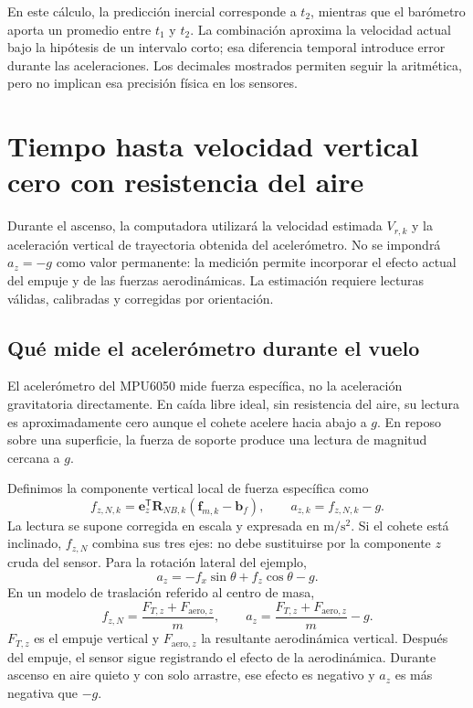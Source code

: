 \documentclass[11pt,a4paper]{article}
\begin{document}
En este cálculo, la predicción inercial corresponde a $t_2$, mientras que el barómetro aporta un promedio entre $t_1$ y $t_2$. La combinación aproxima la velocidad actual bajo la hipótesis de un intervalo corto; esa diferencia temporal introduce error durante las aceleraciones. Los decimales mostrados permiten seguir la aritmética, pero no implican esa precisión física en los sensores.
\newpage
\section{Tiempo hasta velocidad vertical cero con resistencia del aire}
Durante el ascenso, la computadora utilizará la velocidad estimada $V_{r,k}$ y la aceleración vertical de trayectoria obtenida del acelerómetro. No se impondrá $a_z=-g$ como valor permanente: la medición permite incorporar el efecto actual del empuje y de las fuerzas aerodinámicas. La estimación requiere lecturas válidas, calibradas y corregidas por orientación.

\subsection{Qué mide el acelerómetro durante el vuelo}
El acelerómetro del MPU6050 mide fuerza específica, no la aceleración gravitatoria directamente. En caída libre ideal, sin resistencia del aire, su lectura es aproximadamente cero aunque el cohete acelere hacia abajo a $g$. En reposo sobre una superficie, la fuerza de soporte produce una lectura de magnitud cercana a $g$.

Definimos la componente vertical local de fuerza específica como
\begin{equation}
 f_{z,N,k}=\mathbf e_z^{\mathsf T}\mathbf R_{NB,k}
 (\mathbf f_{m,k}-\mathbf b_f),
 \qquad \boxed{a_{z,k}=f_{z,N,k}-g}.
\end{equation}
La lectura se supone corregida en escala y expresada en $\mathrm{m/s^2}$. Si el cohete está inclinado, $f_{z,N}$ combina sus tres ejes: no debe sustituirse por la componente $z$ cruda del sensor. Para la rotación lateral del ejemplo,
\begin{equation}
 a_z=-f_x\sin\theta+f_z\cos\theta-g.
\end{equation}
En un modelo de traslación referido al centro de masa,
\begin{equation}
 f_{z,N}=\frac{F_{T,z}+F_{\mathrm{aero},z}}{m},\qquad
 a_z=\frac{F_{T,z}+F_{\mathrm{aero},z}}{m}-g.
\end{equation}
$F_{T,z}$ es el empuje vertical y $F_{\mathrm{aero},z}$ la resultante aerodinámica vertical. Después del empuje, el sensor sigue registrando el efecto de la aerodinámica. Durante ascenso en aire quieto y con solo arrastre, ese efecto es negativo y $a_z$ es más negativa que $-g$.
\end{document}
